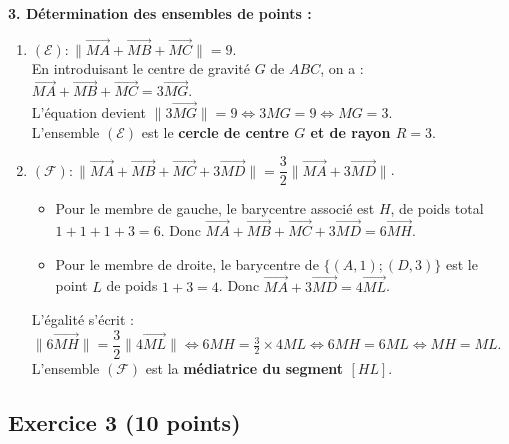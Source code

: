 \documentclass[12pt,a4paper]{article}
\begin{document}
\noindent \textbf{3. Détermination des ensembles de points :}
\begin{enumerate}
    \item[\textbf{a.}] $(\mathcal{E}) : \|\overrightarrow{MA}+\overrightarrow{MB}+\overrightarrow{MC}\|=9$. \\
    En introduisant le centre de gravité $G$ de $ABC$, on a : $\overrightarrow{MA}+\overrightarrow{MB}+\overrightarrow{MC} = 3\overrightarrow{MG}$.\\
    L'équation devient $\|3\overrightarrow{MG}\|=9 \iff 3MG = 9 \iff MG = 3$.\\
    L'ensemble $(\mathcal{E})$ est le \textbf{cercle de centre $G$ et de rayon $R = 3$}.
    
    \item[\textbf{b.}] $(\mathcal{F}) : \|\overrightarrow{MA}+\overrightarrow{MB}+\overrightarrow{MC}+3\overrightarrow{MD}\|=\dfrac{3}{2}\|\overrightarrow{MA}+3\overrightarrow{MD}\|$.
    \begin{itemize}
        \item Pour le membre de gauche, le barycentre associé est $H$, de poids total $1+1+1+3=6$. Donc $\overrightarrow{MA}+\overrightarrow{MB}+\overrightarrow{MC}+3\overrightarrow{MD} = 6\overrightarrow{MH}$.
        \item Pour le membre de droite, le barycentre de $\{(A,1);(D,3)\}$ est le point $L$ de poids $1+3=4$. Donc $\overrightarrow{MA}+3\overrightarrow{MD} = 4\overrightarrow{ML}$.
    \end{itemize}
    L'égalité s'écrit : $\|6\overrightarrow{MH}\| = \dfrac{3}{2}\|4\overrightarrow{ML}\| \iff 6MH = \frac{3}{2} \times 4 ML \iff 6MH = 6ML \iff MH = ML$.\\
    L'ensemble $(\mathcal{F})$ est la \textbf{médiatrice du segment $[HL]$}.
\end{enumerate}

\smallbreak
\hrulefill
\smallbreak

\subsection*{Exercice 3 \hfill (10 points)}
\end{document}
